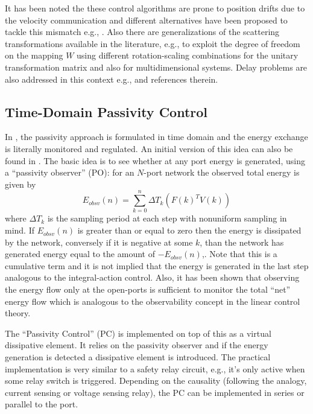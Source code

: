 It has been noted the these control algorithms are prone to position drifts due to the velocity communication and 
different alternatives have been proposed to tackle this mismatch e.g., \cite{yokokohji,chopratro06}. 
Also there are generalizations of the scattering transformations available in the literature, e.g., 
\cite{hirchebuss} to exploit the degree of freedom on the mapping $W$ using different rotation-scaling 
combinations for the unitary transformation matrix and also \cite{stramigioli} for multidimensional systems. 
Delay problems are also addressed in this context e.g., \cite{chopraberes,munirbook,nieslotine97,uedayoshikawa} 
and references therein. 



\subsection{Time-Domain Passivity Control}
In \cite{hannafordryu}, the passivity approach is formulated in time domain and the energy exchange is literally
monitored and regulated. An initial version of this idea can also be found in \cite{yokokohji}. The basic idea is 
to see whether at any port energy is generated, using a \enquote{passivity observer} (PO): for an $N$-port 
network the observed total energy is given by
\[
E_{obsv}(n) = \sum_{k=0}^n \Delta T_k(F(k)^TV(k))
\]
where $\Delta T_k$ is the sampling period at each step with nonuniform sampling in mind. If 
$E_{obsv}(n) $ is greater than or equal to zero then the energy is dissipated by the network, conversely if
it is negative at some $k$, than the network has generated energy equal to the amount of $-E_{obsv}(n)$,. Note that
this is a cumulative term and it is not implied that the energy is generated in the last step analogous to the 
integral-action control. Also, it has been shown that observing the energy flow only at the open-ports is 
sufficient to monitor the total \enquote{net} energy flow which is analogous to the observability concept in the 
linear control theory. 

The \enquote{Passivity Control} (PC) is implemented on top of this as a virtual dissipative element. It relies on the 
passivity observer and if the energy generation is detected a dissipative element is introduced. The practical 
implementation is very similar to a safety relay circuit, e.g., it's only active when some relay switch is 
triggered. Depending on the causality (following the analogy, current sensing or voltage sensing relay), the 
PC can be implemented in series or parallel to the port. 

